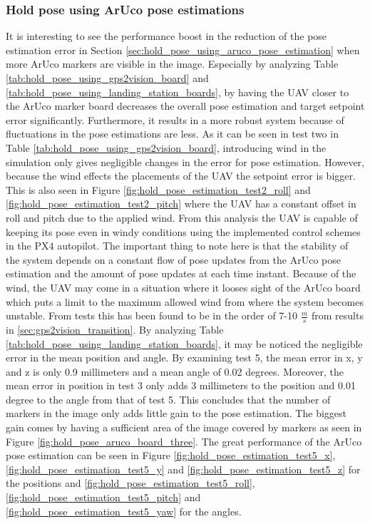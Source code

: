 \documentclass[../Head/report.tex]{subfiles}
\begin{document}
\subsubsection*{Hold pose using ArUco pose estimations}
It is interesting to see the performance boost in the reduction of the pose estimation error in Section \ref{sec:hold_pose_using_aruco_pose_estimation} when more ArUco markers are visible in the image. Especially by analyzing Table \ref{tab:hold_pose_using_gps2vision_board} and \ref{tab:hold_pose_using_landing_station_boards}, by having the UAV closer to the ArUco marker board decreases the overall pose estimation and target setpoint error significantly. Furthermore, it results in a more robust system because of fluctuations in the pose estimations are less. As it can be seen in test two in Table \ref{tab:hold_pose_using_gps2vision_board}, introducing wind in the simulation only gives negligible changes in the error for pose estimation. However, because the wind effects the placements of the UAV the setpoint error is bigger. This is also seen in Figure \ref{fig:hold_pose_estimation_test2_roll} and \ref{fig:hold_pose_estimation_test2_pitch} where the UAV has a constant offset in roll and pitch due to the applied wind. From this analysis the UAV is capable of keeping its pose even in windy conditions using the implemented control schemes in the PX4 autopilot. The important thing to note here is that the stability of the system depends on a constant flow of pose updates from the ArUco pose estimation and the amount of pose updates at each time instant. Because of the wind, the UAV may come in a situation where it looses sight of the ArUco board which puts a limit to the maximum allowed wind from where the system becomes unstable. From tests this has been found to be in the order of 7-10 $\frac{m}{s}$ from results in \ref{sec:gps2vision_transition}. By analyzing Table \ref{tab:hold_pose_using_landing_station_boards}, it may be noticed the negligible error in the mean position and angle. By examining test 5, the mean error in x, y and z is only 0.9 millimeters and a mean angle of 0.02 degrees. Moreover, the mean error in position in test 3 only adds 3 millimeters to the position and 0.01 degree to the angle from that of test 5. This concludes that the number of markers in the image only adds little gain to the pose estimation. The biggest gain comes by having a sufficient area of the image covered by markers as seen in Figure \ref{fig:hold_pose_aruco_board_three}. The great performance of the ArUco pose estimation can be seen in Figure \ref{fig:hold_pose_estimation_test5_x}, \ref{fig:hold_pose_estimation_test5_y} and \ref{fig:hold_pose_estimation_test5_z} for the positions and \ref{fig:hold_pose_estimation_test5_roll}, \ref{fig:hold_pose_estimation_test5_pitch} and \ref{fig:hold_pose_estimation_test5_yaw} for the angles. 
\end{document}
